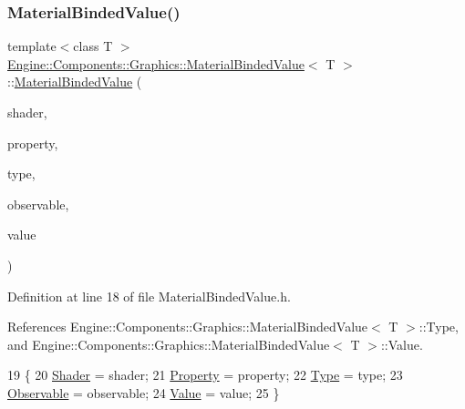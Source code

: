 \subsubsection{\texorpdfstring{Material\+Binded\+Value()}{MaterialBindedValue()}}
{\footnotesize\ttfamily template$<$class T $>$ \\
\mbox{\hyperlink{classEngine_1_1Components_1_1Graphics_1_1MaterialBindedValue}{Engine\+::\+Components\+::\+Graphics\+::\+Material\+Binded\+Value}}$<$ T $>$\+::\mbox{\hyperlink{classEngine_1_1Components_1_1Graphics_1_1MaterialBindedValue}{Material\+Binded\+Value}} (\begin{DoxyParamCaption}\item[{\mbox{\hyperlink{classEngine_1_1Components_1_1Graphics_1_1Shader}{Shader}} $\ast$}]{shader,  }\item[{const G\+Lchar $\ast$}]{property,  }\item[{\mbox{\hyperlink{namespaceEngine_1_1Components_1_1Graphics_a44f5a2b57ee82aed849896c8311e403b}{Material\+Value\+Type}}}]{type,  }\item[{\mbox{\hyperlink{classObservable}{Observable}}$<$ T $>$ $\ast$}]{observable,  }\item[{void $\ast$}]{value }\end{DoxyParamCaption})\hspace{0.3cm}{\ttfamily [inline]}}



Definition at line 18 of file Material\+Binded\+Value.\+h.



References Engine\+::\+Components\+::\+Graphics\+::\+Material\+Binded\+Value$<$ T $>$\+::\+Type, and Engine\+::\+Components\+::\+Graphics\+::\+Material\+Binded\+Value$<$ T $>$\+::\+Value.


\begin{DoxyCode}
19                 \{
20                     \mbox{\hyperlink{classEngine_1_1Components_1_1Graphics_1_1MaterialBindedValue_a2c069aa41aebee61554ce21b54a08ec8}{Shader}} = shader;
21                     \mbox{\hyperlink{classProperty}{Property}} = property;
22                     \mbox{\hyperlink{classEngine_1_1Components_1_1Graphics_1_1MaterialBindedValue_acb1b73dd34f8cd4ff9d68f0ce483e372}{Type}} = type;
23                     \mbox{\hyperlink{classObservable}{Observable}} = observable;
24                     \mbox{\hyperlink{classEngine_1_1Components_1_1Graphics_1_1MaterialBindedValue_a954c91d9f00092782f0ed0b840d92e26}{Value}} = value;
25                 \}
\end{DoxyCode}


